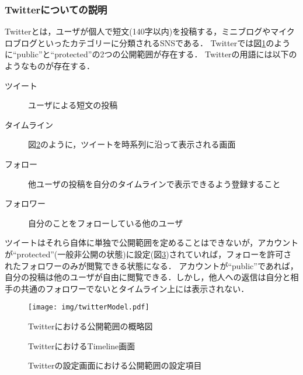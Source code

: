 \subsubsection{Twitterについての説明}
Twitterとは，ユーザが個人で短文(140字以内)を投稿する，ミニブログやマイクロブログといったカテゴリーに分類されるSNSである．
Twitterでは図\ref{fig:twitterModel}のように``public''と``protected''の2つの公開範囲が存在する\cite{twitterProtected}．
Twitterの用語には以下のようなものが存在する．
\begin{description}
  \item[ツイート] ユーザによる短文の投稿
  \item[タイムライン] 図\ref{fig:twitterTimeline}のように，ツイートを時系列に沿って表示される画面
  \item[フォロー] 他ユーザの投稿を自分のタイムラインで表示できるよう登録すること
  \item[フォロワー] 自分のことをフォローしている他のユーザ
\end{description}

ツイートはそれら自体に単独で公開範囲を定めることはできないが，アカウントが``protected''(一般非公開の状態)に設定(図\ref{fig:twitterProtect})されていれば，フォローを許可されたフォロワーのみが閲覧できる状態になる．
アカウントが``public''であれば，自分の投稿は他のユーザが自由に閲覧できる．しかし，他人への返信は自分と相手の共通のフォロワーでないとタイムライン上には表示されない．

\begin{figure}[ht]
  \begin{center}
    \texttt{[image: img/twitterModel.pdf]}
  \end{center}
  \caption{Twitterにおける公開範囲の概略図}
  \label{fig:twitterModel}
\end{figure}

\begin{figure}[th]
  \begin{center}
  \end{center}
  \caption{TwitterにおけるTimeline画面}
  \label{fig:twitterTimeline}
\end{figure}

\begin{figure}[th]
  \begin{center}
  \end{center}
  \caption{Twitterの設定画面における公開範囲の設定項目}
  \label{fig:twitterProtect}
\end{figure}

